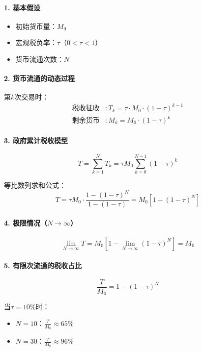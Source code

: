 \paragraph{1. 基本假设}
\begin{itemize}[nosep]
    \item 初始货币量：$M_0$
    \item 宏观税负率：$\tau$（$0 < \tau < 1$）
    \item 货币流通次数：$N$
\end{itemize}

\paragraph{2. 货币流通的动态过程}
第$k$次交易时：
\begin{align*}
    \text{税收征收} &: T_k = \tau \cdot M_0 \cdot (1-\tau)^{k-1} \\
    \text{剩余货币} &: M_k = M_0 \cdot (1-\tau)^k
\end{align*}

\paragraph{3. 政府累计税收模型}
\begin{equation}
    T = \sum_{k=1}^N T_k = \tau M_0 \sum_{k=0}^{N-1} (1-\tau)^k
\end{equation}

等比数列求和公式：
\begin{equation}
    T = \tau M_0 \cdot \frac{1-(1-\tau)^N}{1-(1-\tau)} = M_0 \left[1 - (1-\tau)^N \right]
\end{equation}

\paragraph{4. 极限情况（$N \to \infty$）}
\begin{equation}
    \lim_{N \to \infty} T = M_0 \left[1 - \lim_{N \to \infty} (1-\tau)^N \right] = M_0
\end{equation}

\paragraph{5. 有限次流通的税收占比}
\begin{equation}
    \frac{T}{M_0} = 1 - (1-\tau)^N
\end{equation}

当$\tau=10\%$时：
\begin{itemize}[nosep]
    \item $N=10$：$\frac{T}{M_0} \approx 65\%$
    \item $N=30$：$\frac{T}{M_0} \approx 96\%$
\end{itemize}

